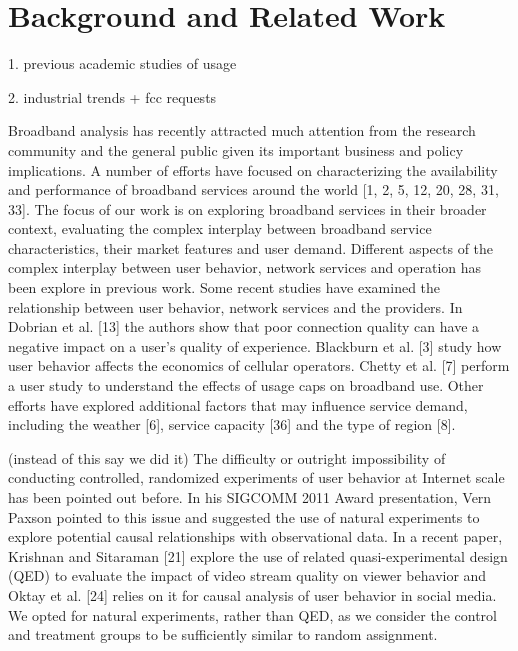 \section{Background and Related Work}\label{sec:related}

1. previous academic studies of usage

2. industrial trends + fcc requests
\cite{fcc2015broadband-report}

Broadband analysis has recently attracted much attention
from the research community and the general public given
its important business and policy implications. A number
of efforts have focused on characterizing the availability and
performance of broadband services around the world [1, 2,
5, 12, 20, 28, 31, 33]. The focus of our work is on exploring
broadband services in their broader context, evaluating the
complex interplay between broadband service characteristics,
their market features and user demand.
Different aspects of the complex interplay between user
behavior, network services and operation has been explore
in previous work. Some recent studies have examined the
relationship between user behavior, network services and
the providers. In Dobrian et al. [13] the authors show that
poor connection quality can have a negative impact on a
user’s quality of experience. Blackburn et al. [3] study how
user behavior affects the economics of cellular operators.
Chetty et al. [7] perform a user study to understand the
effects of usage caps on broadband use. Other efforts
have explored additional factors that may influence service
demand, including the weather [6], service capacity [36] and
the type of region [8].




(instead of this say we did it)
The difficulty or outright impossibility of conducting controlled,
randomized experiments of user behavior at Internet
scale has been pointed out before. In his SIGCOMM 2011
Award presentation, Vern Paxson pointed to this issue
and suggested the use of natural experiments to explore
potential causal relationships with observational data. In
a recent paper, Krishnan and Sitaraman [21] explore the
use of related quasi-experimental design (QED) to evaluate
the impact of video stream quality on viewer behavior and
Oktay et al. [24] relies on it for causal analysis of user
behavior in social media. We opted for natural experiments,
rather than QED, as we consider the control and treatment
groups to be sufficiently similar to random assignment.